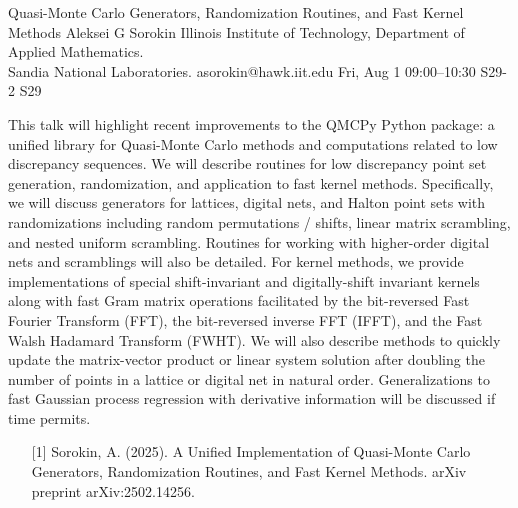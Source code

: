 \begin{talk}
  {Quasi-Monte Carlo Generators, Randomization Routines, and Fast Kernel Methods}%
  {Aleksei G Sorokin}%
  {Illinois Institute of Technology, Department of Applied Mathematics. \\ Sandia National Laboratories.}%
  {asorokin@hawk.iit.edu}%
  {}%
  {}%
  {Fri, Aug 1 09:00–10:30}%
  {S29-2}%
  {S29}%
  
				
			
        This talk will highlight recent improvements to the QMCPy Python package: a unified library for Quasi-Monte Carlo methods and computations related to low discrepancy sequences. We will describe routines for low discrepancy point set generation, randomization, and application to fast kernel methods. Specifically, we will discuss generators for lattices, digital nets, and Halton point sets with randomizations including random permutations / shifts, linear matrix scrambling, and nested uniform scrambling. Routines for working with higher-order digital nets and scramblings will also be detailed. For kernel methods, we provide implementations of special shift-invariant and digitally-shift invariant kernels along with fast Gram matrix operations facilitated by the bit-reversed Fast Fourier Transform (FFT), the bit-reversed inverse FFT (IFFT), and the Fast Walsh Hadamard Transform (FWHT). We will also describe methods to quickly update the matrix-vector product or linear system solution after doubling the number of points in a lattice or digital net in natural order. Generalizations to fast Gaussian process regression with derivative information will be discussed if time permits. 
\medskip

\begin{enumerate}
	\item[{[1]}] Sorokin, A. (2025). A Unified Implementation of Quasi-Monte Carlo Generators, Randomization Routines, and Fast Kernel Methods. arXiv preprint arXiv:2502.14256.
\end{enumerate}

\end{talk}

